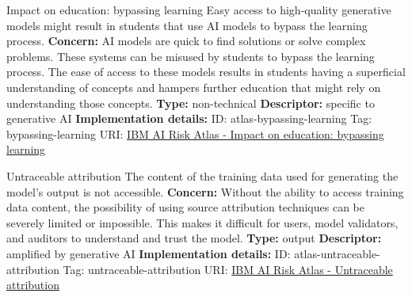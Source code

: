 \documentclass[a4paper,12pt]{article}
\begin{document}
\begin{definitionbox}{Impact on education: bypassing learning}
Easy access to high-quality generative models might result in students that use AI models to bypass the learning process.\newline\newline
\textbf{Concern: }AI models are quick to find solutions or solve complex problems. These systems can be misused by students to bypass the learning process. The ease of access to these models results in students having a superficial understanding of concepts and hampers further education that might rely on understanding those concepts.\newline\newline
\textbf{Type: }non-technical\newline
\textbf{Descriptor: }specific to generative AI \newline\newline
\textbf{Implementation details: } \newline
ID: atlas-bypassing-learning \newline
Tag: bypassing-learning \newline
URI:  \href{https://www.ibm.com/docs/en/watsonx/saas?topic=SSYOK8/wsj/ai-risk-atlas/bypassing-learning.html}{IBM AI Risk Atlas - Impact on education: bypassing learning}\newline
\end{definitionbox}
\begin{definitionbox}{Untraceable attribution}
The content of the training data used for generating the model's output is not accessible.\newline\newline
\textbf{Concern: }Without the ability to access training data content, the possibility of using source attribution techniques can be severely limited or impossible. This makes it difficult for users, model validators, and auditors to understand and trust the model.\newline\newline
\textbf{Type: }output\newline
\textbf{Descriptor: }amplified by generative AI \newline\newline
\textbf{Implementation details: } \newline
ID: atlas-untraceable-attribution \newline
Tag: untraceable-attribution \newline
URI:  \href{https://www.ibm.com/docs/en/watsonx/saas?topic=SSYOK8/wsj/ai-risk-atlas/untraceable-attribution.html}{IBM AI Risk Atlas - Untraceable attribution}\newline
\end{definitionbox}
\end{document}
